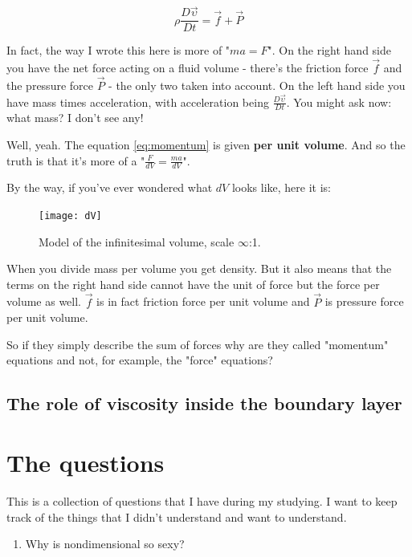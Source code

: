 \documentclass[12pt]{report}
\begin{document}
\begin{equation}
\rho \frac{D \vec{\upsilon}}{Dt} = \vec{f} + \vec{P}
\label{eq:momentum}
\end{equation}

In fact, the way I wrote this here is more of "$ma=F$". On the right hand side you have the net force acting on a fluid volume - there's the friction force $\vec{f}$ and the pressure force $\vec{P}$ - the only two taken into account. On the left hand side you have mass times acceleration, with acceleration being $\frac{D \vec{\upsilon}}{Dt}$. You might ask now: what mass? I don't see any! 

Well, yeah. The equation \ref{eq:momentum} is given \textbf{per unit volume}. And so the truth is that it's more of a "$\frac{F}{dV} = \frac{ma}{dV}$". 

By the way, if you've ever wondered what $dV$ looks like, here it is:

\begin{figure}[H]
\centering\texttt{[image: dV]}
\caption{Model of the infinitesimal volume, scale $\infty$:1.}			
\label{fig:infinitesimals}
\end{figure}


When you divide mass per volume you get density. But it also means that the terms on the right hand side cannot have the unit of force but the force per volume as well. $\vec{f}$ is in fact friction force per unit volume and $\vec{P}$ is pressure force per unit volume.



So if they simply describe the sum of forces why are they called "momentum" equations and not, for example, the "force" equations?



\section{The role of viscosity inside the boundary layer} \label{chap:viscosity}











\chapter{The questions}

This is a collection of questions that I have during my studying. I want to keep track of the things that I didn't understand and want to understand.

\begin{enumerate}
\item Why is nondimensional so sexy?
\end{enumerate}


\newpage

\begin{thebibliography}{50}



\end{thebibliography}
\end{document}
